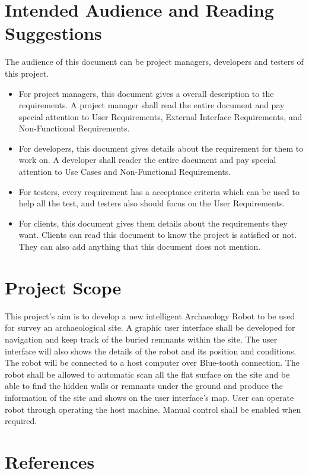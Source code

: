\documentclass[11pt, a4paper]{report}
\begin{document}
\section{Intended Audience and Reading Suggestions}
The audience of this document can be project managers, developers and testers of this project. 
\begin{itemize}
\item For project managers, this document gives a overall description to the requirements. A project manager shall read the entire document and pay special attention to User Requirements, External Interface Requirements, and Non-Functional Requirements.
\item For developers, this document gives details about the requirement for them to work on. A developer shall reader the entire document and pay special attention to Use Cases and Non-Functional Requirements. 
\item For testers, every requirement has a acceptance criteria which can be used to help all the test, and testers also should focus on the User Requirements. 
\item For clients, this document gives them details about the requirements they want. Clients can read this document to know the project is satisfied or not. They can also add anything that this document does not mention. 
\end{itemize}


\section{Project Scope}
This project's aim is to develop a new intelligent Archaeology Robot to be used for survey an archaeological site. A graphic user interface shall be developed for navigation and keep track of the buried remnants within the site. The user interface will also shows the details of the robot and its position and conditions. The robot will be connected to a host computer over Blue-tooth connection. The robot shall be allowed to automatic scan all the flat surface on the site and be able to find the hidden walls or remnants under the ground and produce the information of the site and shows on the user interface's map. 
User can operate robot through operating the host machine. Manual control shall be enabled when required.


\section{References}
\end{document}

